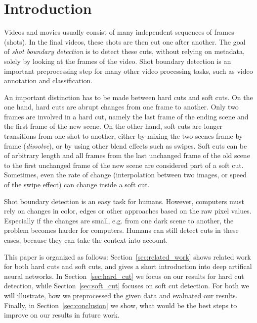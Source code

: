 \section{Introduction}
\label{sec:introduction}

Videos and movies usually consist of many independent sequences of frames (shots).
In the final videos, these shots are then cut one after another.
The goal of \emph{shot boundary detection} is to detect these cuts, without relying on metadata, solely by looking at the frames of the video.
Shot boundary detection is an important preprocessing step for many other video processing tasks, such as video annotation and classification.

An important distinction has to be made between hard cuts and soft cuts.
On the one hand, hard cuts are abrupt changes from one frame to another.
Only two frames are involved in a hard cut, namely the last frame of the ending scene and the first frame of the new scene.
On the other hand, soft cuts are longer transitions from one shot to another, either by mixing the two scenes frame by frame (\emph{dissolve}), or by using other blend effects such as swipes.
Soft cuts can be of arbitrary length and all frames from the last unchanged frame of the old scene to the first unchanged frame of the new scene are considered part of a soft cut.
Sometimes, even the rate of change (interpolation between two images, or speed of the swipe effect) can change inside a soft cut.

Shot boundary detection is an easy task for humans.
However, computers must rely on changes in color, edges or other approaches based on the raw pixel values.
Especially if the changes are small, e.g. from one dark scene to another, the problem becomes harder for computers.
Humans can still detect cuts in these cases, because they can take the context into account.


This paper is organized as follows:
Section~\ref{sec:related_work} shows related work for both hard cuts and soft cuts, and gives a short introduction into deep artifical neural networks.
In Section~\ref{sec:hard_cut} we focus on our results for hard cut detection, while Section~\ref{sec:soft_cut} focuses on soft cut detection.
For both we will illustrate, how we preprocessed the given data and evaluated our results.
Finally, in Section~\ref{sec:conclusion} we show, what would be the best steps to improve on our results in future work.
